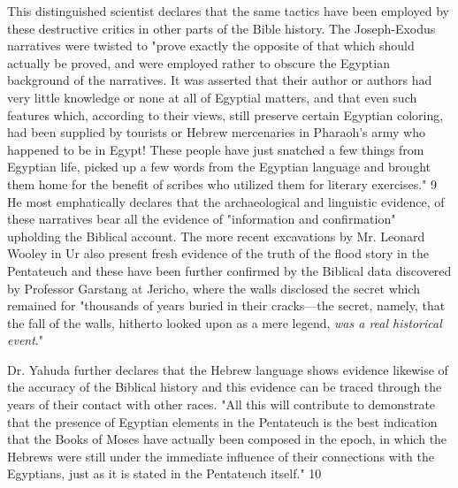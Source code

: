 This distinguished scientist declares that the same tactics have been employed by these
destructive critics in other parts of the Bible history. The Joseph-Exodus narratives were
twisted to "prove exactly the opposite of that which should actually be proved, and were
employed rather to obscure the Egyptian background of the narratives. It was asserted that
their author or authors had very little knowledge or none at all of Egyptial matters, and that
even such features which, according to their views, still preserve certain Egyptian coloring,
had been supplied by tourists or Hebrew mercenaries in Pharaoh's army who happened to be
in Egypt! These people have just snatched a few things from Egyptian life, picked up a few
words from the Egyptian language and brought them home for the benefit of scribes who
utilized them for literary exercises." 9 He most emphatically declares that the archaeological
and linguistic evidence, of these narratives bear all the evidence of "information and
confirmation" upholding the Biblical account. The more recent excavations by Mr. Leonard
Wooley in Ur also present fresh evidence of the truth of the flood story in the Pentateuch and
these have been further confirmed by the Biblical data discovered by Professor Garstang at
Jericho, where the walls disclosed the secret which remained for "thousands of years buried
in their cracks—the secret, namely, that the fall of the walls, hitherto looked upon as a mere
legend, \textit{was a real historical event}."

Dr. Yahuda further declares that the Hebrew language shows evidence likewise of the
accuracy of the Biblical history and this evidence can be traced through the years of their
contact with other races. "All this will contribute to demonstrate that the presence of
Egyptian elements in the Pentateuch is the best indication that the Books of Moses have
actually been composed in the epoch, in which the Hebrews were still under the immediate
influence of their connections with the Egyptians, just as it is stated in the Pentateuch itself."
10

